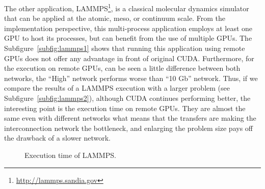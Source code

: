 \documentclass[a4paper,twoside]{article}
\begin{document}
The other application, LAMMPS\footnote{\url{http://lammps.sandia.gov}}, is a classical molecular dynamics simulator that can be applied at the atomic, meso, or continuum scale. 
From the implementation perspective, this multi-process application employs at least one GPU to host its processes, but can benefit from the use of multiple GPUs.
The Subfigure~\ref{subfig:lammps1} shows that running this application using remote GPUs does not offer any advantage in front of original CUDA. 
Furthermore, for the execution on remote GPUs, can be seen a little difference between both networks, the ``High'' network performs worse than ``10 Gb'' network.
Thus, if we compare the results of a LAMMPS execution with a larger problem (see Subfigure~\ref{subfig:lammps2}), although CUDA continues performing better, the interesting point is the execution time on remote GPUs. 
They are almost the same even with different networks what means that the transfers are making the interconnection network the bottleneck, and enlarging the problem size
pays off the drawback of a slower network.

\begin{figure}[htb]
\centering
{}
\quad
{}
\caption{Execution time of LAMMPS.}
\label{fig:lammps}
\end{figure}
\end{document}
